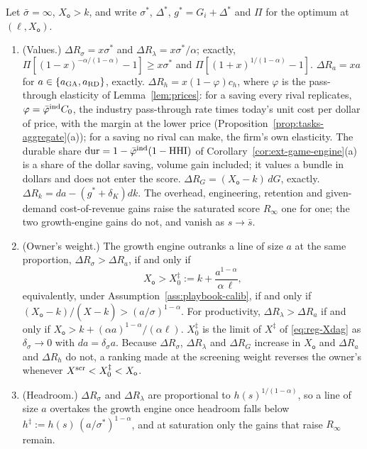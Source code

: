 \begin{proposition}\label{prop:playbook-rank}
Let $\bar\sigma=\infty$, $X_{\mathsf o}>k$, and write $\sigma^*$, $\Delta^*$, $g^*=G_i+\Delta^*$ and $\Pi$ for the optimum at $(\ell,X_{\mathsf o})$.
\begin{enumerate}
\item[(a)] (Values.) $\Delta R_\sigma=x\sigma^*$ and $\Delta R_\lambda=x\sigma^*/\alpha$; exactly, $\Pi[(1-x)^{-\alpha/(1-\alpha)}-1]\ge x\sigma^*$ and $\Pi[(1+x)^{1/(1-\alpha)}-1]$. $\Delta R_a=xa$ for $a\in\{a_{\rm GA},a_{\rm RD}\}$, exactly. $\Delta R_h=x(1-\varphi)c_h$, where $\varphi$ is the pass-through elasticity of Lemma~\ref{lem:prices}: for a saving every rival replicates, $\varphi=\bar\varphi^{\rm ind}C_0$, the industry pass-through rate times today's unit cost per dollar of price, with the margin at the lower price (Proposition~\ref{prop:tasks-aggregate}(a)); for a saving no rival can make, the firm's own elasticity. The durable share $\mathrm{dur}=1-\bar\varphi^{\rm ind}(1-\mathrm{HHI})$ of Corollary~\ref{cor:ext-game-engine}(a) is a share of the dollar saving, volume gain included; it values a bundle in dollars and does not enter the score. $\Delta R_G=(X_{\mathsf o}-k)\,dG$, exactly. $\Delta R_k=da-(g^*+\delta_K)dk$. The overhead, engineering, retention and given-demand cost-of-revenue gains raise the saturated score $R_\infty$ one for one; the two growth-engine gains do not, and vanish as $s\to\bar s$.
\item[(b)] (Owner's weight.) The growth engine outranks a line of size $a$ at the same proportion, $\Delta R_\sigma>\Delta R_a$, if and only if
\begin{equation}\label{eq:playbook-xdag}
X_{\mathsf o}>X^\ddagger_0:=k+\frac{a^{1-\alpha}}{\alpha\,\ell},
\end{equation}
equivalently, under Assumption~\ref{ass:playbook-calib}, if and only if $(X_{\mathsf o}-k)/(\hat X-k)>(a/\sigma)^{1-\alpha}$. For productivity, $\Delta R_\lambda>\Delta R_a$ if and only if $X_{\mathsf o}>k+(\alpha a)^{1-\alpha}/(\alpha\ell)$. $X^\ddagger_0$ is the limit of $X^\ddagger$ of \eqref{eq:reg-Xdag} as $\delta_\sigma\to0$ with $da=\delta_\sigma a$. Because $\Delta R_\sigma$, $\Delta R_\lambda$ and $\Delta R_G$ increase in $X_{\mathsf o}$ and $\Delta R_a$ and $\Delta R_h$ do not, a ranking made at the screening weight reverses the owner's whenever $X^{\rm scr}<X^\ddagger_0<X_{\mathsf o}$.
\item[(c)] (Headroom.) $\Delta R_\sigma$ and $\Delta R_\lambda$ are proportional to $h(s)^{1/(1-\alpha)}$, so a line of size $a$ overtakes the growth engine once headroom falls below $h^\ddagger:=h(s)\,(a/\sigma^*)^{1-\alpha}$, and at saturation only the gains that raise $R_\infty$ remain.

\end{enumerate}
\end{proposition}
